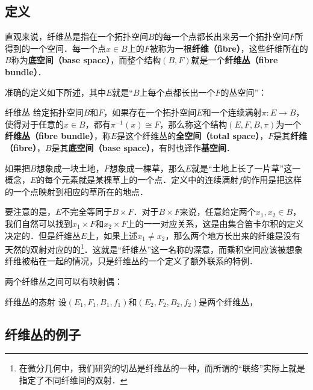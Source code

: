 
\begin{issues}
\issueDraft
\end{issues}


\subsection{定义}

直观来说，纤维丛是指在一个拓扑空间$B$的每一个点都长出来另一个拓扑空间$F$所得到的一个空间．每一个点$x\in B$上的$F$被称为一根\textbf{纤维（fibre）}，这些纤维所在的$B$称为\textbf{底空间（base space）}，而整个结构$(B, F)$就是一个\textbf{纤维丛（fibre bundle）}．

准确的定义如下所述，其中$E$就是“$B$上每个点都长出一个$F$的丛空间”：

\begin{definition}{纤维丛}
给定拓扑空间$B$和$F$，如果存在一个拓扑空间$E$和一个连续满射$\pi:E\rightarrow B$，使得对于任意的$x\in B$，都有$\pi^{-1}(x)\cong F$，那么称这个结构$(E, F, B, \pi)$为一个\textbf{纤维丛（fibre bundle）}，称$E$是这个纤维丛的\textbf{全空间（total space）}，$F$是其\textbf{纤维（fibre）}，$B$是其\textbf{底空间（base space）}，有时也译作\textbf{基空间}．
\end{definition}

如果把$B$想象成一块土地，$F$想象成一棵草，那么$E$就是“土地上长了一片草”这一概念，$E$的每个元素就是某棵草上的一个点．定义中的连续满射$f$的作用是把这样的一个点映射到相应的草所在的地点．

要注意的是，$E$不完全等同于$B\times F$．对于$B\times F$来说，任意给定两个$x_1, x_2\in B$，我们自然可以找到$x_1\times F$和$x_2\times F$上的一一对应关系，这是由集合笛卡尔积的定义决定的．但是纤维丛$E$上，如果上述$x_1\not=x_2$，那么两个地方长出来的纤维是没有天然的双射对应的的\footnote{在微分几何中，我们研究的切丛是纤维丛的一种，而所谓的“联络”实际上就是指定了不同纤维间的双射．}．这就是“纤维丛”这一名称的深意，而乘积空间应该被想象纤维被粘在一起的情况，只是纤维丛的一个定义了额外联系的特例．

两个纤维丛之间可以有映射偶：

\begin{definition}{纤维丛的态射}
设$(E_1, F_1, B_1, f_1)$和$(E_2, F_2, B_2, f_2)$是两个纤维丛，
\end{definition}

\subsection{纤维丛的例子}






